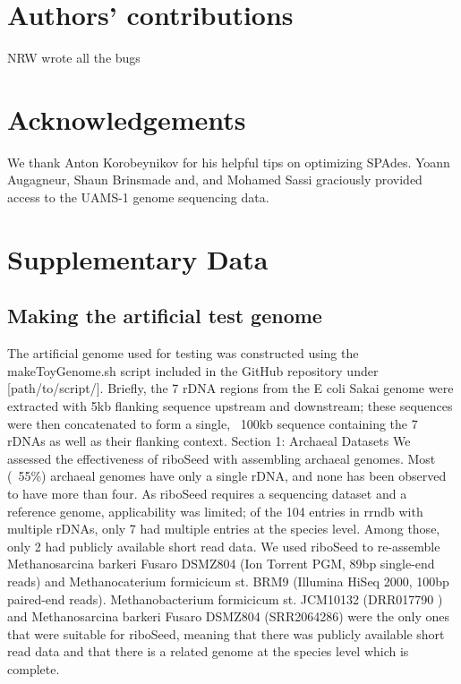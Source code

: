 \documentclass[11pt]{article}
\newcommand{\beginsupplement}{%
        \setcounter{table}{0}
        \renewcommand{\thetable}{S\arabic{table}}%
        \setcounter{figure}{0}
        \renewcommand{\thefigure}{S\arabic{figure}}%
     }
\begin{document}
\begin{linenumbers}
\section*{Authors' contributions}
NRW wrote all the bugs


\section*{Acknowledgements}
We thank Anton Korobeynikov for his helpful tips on optimizing SPAdes. Yoann Augagneur, Shaun Brinsmade and, and Mohamed Sassi graciously provided access to the UAMS-1 genome sequencing data.


\end{linenumbers}

\baselineskip13pt
\pagebreak


\beginsupplement
\section*{Supplementary Data}


\subsection*{Making the artificial test genome}
The artificial genome used for testing was constructed using the makeToyGenome.sh script included in the GitHub repository under [path/to/script/]. Briefly, the 7 rDNA regions from the E coli Sakai genome were extracted with 5kb flanking sequence upstream and downstream; these sequences were then concatenated to form a single, ~100kb sequence containing the 7 rDNAs as well as their flanking context.
Section 1: Archaeal Datasets
We assessed the effectiveness of riboSeed with assembling archaeal genomes. Most (~55\%) archaeal genomes have only a single rDNA, and none has been observed to have more than four. As riboSeed requires a sequencing dataset and a reference genome, applicability was limited; of the 104 entries in rrndb with multiple rDNAs, only 7 had multiple entries at the species level. Among those, only 2 had publicly available short read data. We used riboSeed to re-assemble Methanosarcina barkeri Fusaro DSMZ804 (Ion Torrent PGM, 89bp single-end reads) and Methanocaterium formicicum st. BRM9 (Illumina HiSeq 2000, 100bp paired-end reads). Methanobacterium formicicum st. JCM10132 (DRR017790 ) and Methanosarcina barkeri Fusaro DSMZ804 (SRR2064286) were the only ones that were suitable for riboSeed, meaning that there was publicly available short read data and that there is a related genome at the species level which is complete.
\end{document}
